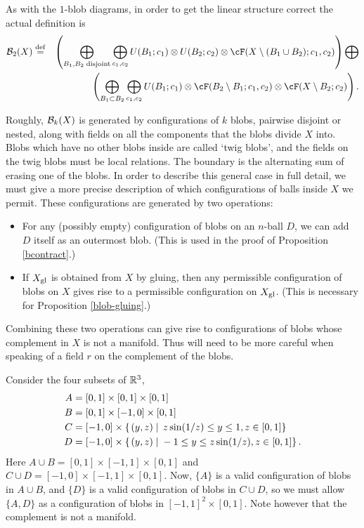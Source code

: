 As with the $1$-blob diagrams, in order to get the linear structure correct the actual definition is 
\begin{eqnarray*}
	\bc_2(X) & \deq &
	\left( 
		\bigoplus_{B_1, B_2\; \text{disjoint}} \bigoplus_{c_1, c_2}
			U(B_1; c_1) \otimes U(B_2; c_2) \otimes \cF(X\setmin (B_1\cup B_2); c_1, c_2)
	\right)  \bigoplus \\
	&& \quad\quad  \left( 
		\bigoplus_{B_1 \subset B_2} \bigoplus_{c_1, c_2}
			U(B_1; c_1) \otimes \cF(B_2 \setmin B_1; c_1, c_2) \tensor \cF(X \setminus B_2; c_2)
	\right) .
\end{eqnarray*}

\medskip

Roughly, ${\mathcal B}_k(X)$ is generated by configurations of $k$ blobs, pairwise disjoint or nested, 
along with fields on all the components that the blobs divide $X$ into. 
Blobs which have no other blobs inside are called `twig blobs', 
and the fields on the twig blobs must be local relations.
The boundary is the alternating sum of erasing one of the blobs.
In order to describe this general case in full detail, we must give a more precise description of
which configurations of balls inside $X$ we permit.
These configurations are generated by two operations:
\begin{itemize}
\item For any (possibly empty) configuration of blobs on an $n$-ball $D$, we can add
$D$ itself as an outermost blob.
(This is used in the proof of Proposition \ref{bcontract}.)
\item If $X_\mathrm{gl}$ is obtained from $X$ by gluing, then any permissible configuration of blobs
on $X$ gives rise to a permissible configuration on $X_\mathrm{gl}$.
(This is necessary for Proposition \ref{blob-gluing}.)
\end{itemize}
Combining these two operations can give rise to configurations of blobs whose complement in $X$ is not
a manifold.
Thus will need to be more careful when speaking of a field $r$ on the complement of the blobs.

\begin{example}
Consider the four subsets of $\mathbb R^3$,
\begin{align*}
A & = [0,1] \times [0,1] \times [0,1] \\
B & = [0,1] \times [-1,0] \times [0,1] \\
C & = [-1,0] \times \left\{ \left. (y,z) \;\right| \; z \sin(1/z) \leq y \leq 1, z \in [0,1] \right\} \\
D & = [-1,0] \times \left\{ \left. (y,z) \;\right| \; -1 \leq y \leq z \sin(1/z), z \in [0,1] \right\}.
\end{align*}
Here $A \cup B = [0,1] \times [-1,1] \times [0,1]$ and $C \cup D = [-1,0] \times [-1,1] \times [0,1]$. 
Now, $\{A\}$ is a valid configuration of blobs in $A \cup B$, 
and $\{D\}$ is a valid configuration of blobs in $C \cup D$, 
so we must allow $\{A, D\}$ as a configuration of blobs in $[-1,1]^2 \times [0,1]$. 
Note however that the complement is not a manifold.
\end{example}

